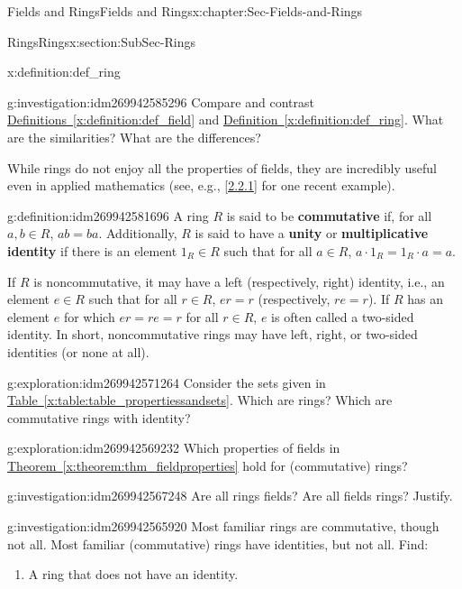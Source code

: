 \documentclass[oneside,10pt,]{book}
\newcommand{\terminology}[1]{\textbf{#1}}
\numberwithin{equation}{section}
\begin{document}
\begin{chapterptx}{Fields and Rings}{}{Fields and Rings}{}{}{x:chapter:Sec-Fields-and-Rings}
\begin{sectionptx}{Rings}{}{Rings}{}{}{x:section:SubSec-Rings}
\begin{definition}{}{x:definition:def_ring}
\end{definition}
\begin{investigation}{}{g:investigation:idm269942585296}%
Compare and contrast \hyperref[x:definition:def_field]{Definitions~\ref{x:definition:def_field}} and \hyperref[x:definition:def_ring]{Definition~\ref{x:definition:def_ring}}. What are the similarities? What are the differences?%
\end{investigation}
While rings do not enjoy all the properties of fields, they are incredibly useful even in applied mathematics (see, e.g., \hyperlink{x:biblio:Curto2013}{[2.2.1]} for one recent example).%
\begin{definition}{}{g:definition:idm269942581696}%
A ring \(R\) is said to be \terminology{commutative} if, for all \(a,b\in R\), \(ab = ba\). Additionally, \(R\) is said to have a \terminology{unity} or \terminology{multiplicative identity} if there is an element \(1_R\in R\) such that for all \(a\in R\), \(a \cdot 1_R = 1_R \cdot a= a\).%
\end{definition}
If \(R\) is noncommutative, it may have a left (respectively, right) identity, i.e., an element \(e\in R\) such that for all \(r\in R\), \(er = r\) (respectively, \(re = r\)). If \(R\) has an element \(e\) for which \(er = re = r\) for all \(r\in R\), \(e\) is often called a two-sided identity. In short, noncommutative rings may have left, right, or two-sided identities (or none at all).%
\begin{exploration}{}{g:exploration:idm269942571264}%
Consider the sets given in \hyperref[x:table:table_propertiessandsets]{Table~\ref{x:table:table_propertiessandsets}}. Which are rings? Which are commutative rings with identity?%
\end{exploration}
\begin{exploration}{}{g:exploration:idm269942569232}%
Which properties of fields in \hyperref[x:theorem:thm_fieldproperties]{Theorem~\ref{x:theorem:thm_fieldproperties}} hold for (commutative) rings?%
\end{exploration}
\begin{investigation}{}{g:investigation:idm269942567248}%
Are all rings fields? Are all fields rings? Justify.%
\end{investigation}
\begin{investigation}{}{g:investigation:idm269942565920}%
Most familiar rings are commutative, though not all. Most familiar (commutative) rings have identities, but not all. Find:%
\begin{enumerate}
\item{}A ring that does not have an identity\footnotemark{}.%

\end{enumerate}
\end{investigation}
\end{sectionptx}
\end{chapterptx}
\end{document}
